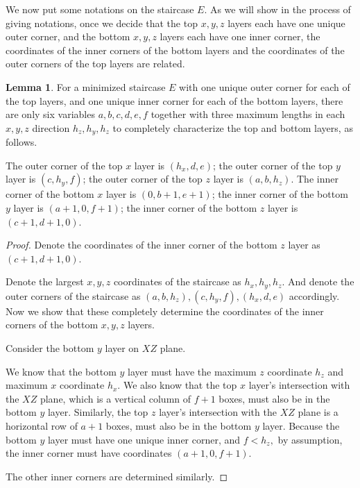 \documentclass{amsart}[10pt]
\theoremstyle{plain}
\theoremstyle{definition}
\newtheorem{lemma}[theorem]{Lemma}
\begin{document}
We now put some notations on the staircase $E$. As we will show in the process of giving notations, once we decide that the top $x,y,z$ layers each have one unique outer corner, and the bottom $x,y,z$ layers each have one inner corner, the coordinates of the inner corners of the bottom layers and the coordinates of the outer corners of the top layers are related. 

\begin{lemma}
\label{all_lengths_top_bottom}
For a minimized staircase $E$ with one unique outer corner for each of the top layers, and one unique inner corner for each of the bottom layers, there are only six variables $a,b,c,d,e,f$ together with three maximum lengths in each $x,y,z$ direction $h_z, h_y,h_z$ to completely characterize the top and bottom layers, as follows.  

The outer corner of the top $x$ layer is $(h_x, d, e)$; the outer corner of the top $y$ layer is $(c, h_y, f)$; the outer corner of the top $z$ layer is $(a, b, h_z)$. The inner corner of the bottom $x$ layer is $(0, b+1, e+1)$; the inner corner of the bottom $y$ layer is $(a+1, 0, f+1)$; the inner corner of the bottom $z$ layer is $(c+1,d+1, 0)$.
\end{lemma}

\begin{proof}
Denote the coordinates of the inner corner of the bottom $z$ layer as $(c+1,d+1,0)$. 

Denote the largest $x,y,z$ coordinates of the staircase as $h_x, h_y, h_z$. And denote the outer corners of the staircase as $(a, b, h_z), (c, h_y, f), (h_x, d, e)$ accordingly. Now we show that these completely determine the coordinates of the inner corners of the bottom $x,y,z$ layers. 


Consider the bottom $y$ layer on $XZ$ plane.

We know that the bottom $y$ layer must have the maximum $z$ coordinate $h_z$ and maximum $x$ coordinate $h_x$. We also know that the top $x$ layer's intersection with the $XZ$ plane, which is a vertical column of $f+1$ boxes, must also be in the bottom $y$ layer. Similarly, the top $z$ layer's intersection with the $XZ$ plane is a horizontal row of $a+1$ boxes, must also be in the bottom $y$ layer. Because the bottom $y$ layer must have one unique inner corner, and $f<h_z, $ by assumption, the inner corner must have coordinates $(a+1, 0, f+1)$.

The other inner corners are determined similarly.
\end{proof}
\end{document}
